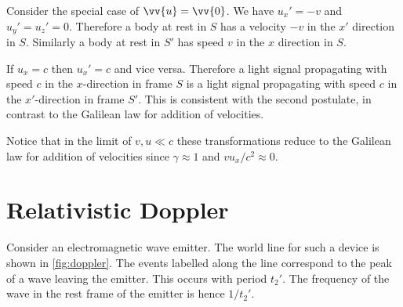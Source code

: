 \documentclass[fleqn]{NotesClass}
\begin{document}
    Consider the special case of \(\vv{u} = \vv{0}\).
    We have \(u_x' = -v\) and \(u_y' = u_z' = 0\).
    Therefore a body at rest in \(S\) has a velocity \(-v\) in the \(x'\) direction in \(S\).
    Similarly a body at rest in \(S'\) has speed \(v\) in the \(x\) direction in \(S\).
    
    If \(u_x = c\) then \(u_x' = c\) and vice versa.
    Therefore a light signal propagating with speed \(c\) in the \(x\)-direction in frame \(S\) is a light signal propagating with speed \(c\) in the \(x'\)-direction in frame \(S'\).
    This is consistent with the second postulate, in contrast to the Galilean law for addition of velocities.
    
    Notice that in the limit of \(v, u \ll c\) these transformations reduce to the Galilean law for addition of velocities since \(\gamma \approx 1\) and \(vu_x/c^2 \approx 0\).
    
    \section{Relativistic Doppler}
    Consider an electromagnetic wave emitter.
    The world line for such a device is shown in \cref{fig:doppler}.
    The events labelled along the line correspond to the peak of a wave leaving the emitter.
    This occurs with period \(t_2'\).
    The frequency of the wave in the rest frame of the emitter is hence \(1/t_2'\).
    
\end{document}
